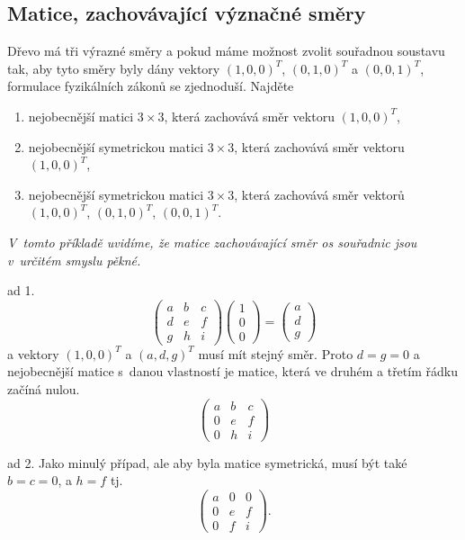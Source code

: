 \konec

\stranka

\subsection{Matice, zachovávající význačné směry} Dřevo má tři výrazné
směry a pokud máme možnost zvolit souřadnou soustavu tak, aby tyto
směry byly dány vektory $(1,0,0)^T$, $(0,1,0)^T$ a $(0,0,1)^T$, formulace
fyzikálních zákonů se zjednoduší. Najděte
\begin{enumerate}
\item  nejobecnější matici $3\times 3$, která zachovává směr vektoru $(1,0,0)^T$,
\item  nejobecnější symetrickou matici $3\times 3$, která zachovává směr vektoru $(1,0,0)^T$,
\item  nejobecnější symetrickou matici $3\times 3$, která zachovává směr vektorů $(1,0,0)^T$, $(0,1,0)^T$, $(0,0,1)^T$.
\end{enumerate}

\textit{V tomto příkladě uvidíme, že matice zachovávající směr os souřadnic jsou v určitém smyslu pěkné.}

\reseni
ad 1.
\begin{equation*}
  \begin{pmatrix}
    a & b & c \\ d & e & f \\ g& h& i \end{pmatrix}
  \begin{pmatrix}
    1\\0\\0
  \end{pmatrix}
  =
  \begin{pmatrix}
    a \\ d \\g
  \end{pmatrix}
\end{equation*}
a vektory $(1,0,0)^T$
a $(a,d,g)^T$ musí mít stejný směr. Proto $d=g=0$ a nejobecnější matice s danou vlastností je matice, která ve druhém a třetím řádku začíná nulou.
\begin{equation*}
    \begin{pmatrix}
    a & b & c \\ 0 & e & f \\ 0& h& i \end{pmatrix}
\end{equation*}

ad 2. Jako minulý případ, ale aby byla matice symetrická, musí být také $b=c=0$, a $h=f$ tj.
\begin{equation*}
    \begin{pmatrix}
    a & 0 & 0 \\ 0 & e & f \\ 0& f& i \end{pmatrix}.
\end{equation*}

